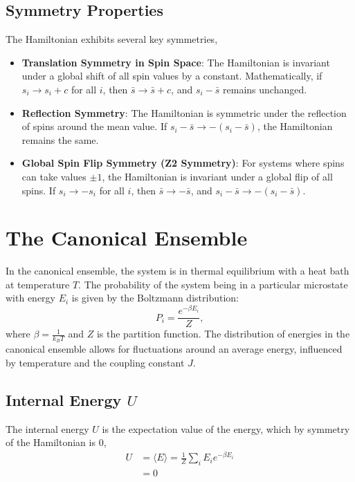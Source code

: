 \documentclass{article}
\begin{document}
\subsection{Symmetry Properties}
The Hamiltonian exhibits several key symmetries,
\begin{itemize}
    \item \textbf{Translation Symmetry in Spin Space}: The Hamiltonian is invariant under a global shift of all spin values by a constant. Mathematically, if \( s_i \to s_i + c \) for all \( i \), then \( \bar{s} \to \bar{s} + c \), and \( s_i - \bar{s} \) remains unchanged.
    \item \textbf{Reflection Symmetry}: The Hamiltonian is symmetric under the reflection of spins around the mean value. If \( s_i - \bar{s} \to - (s_i - \bar{s}) \), the Hamiltonian remains the same.
    \item \textbf{Global Spin Flip Symmetry (Z2 Symmetry)}: For systems where spins can take values \(\pm 1\), the Hamiltonian is invariant under a global flip of all spins. If \( s_i \to -s_i \) for all \( i \), then \( \bar{s} \to -\bar{s} \), and \( s_i - \bar{s} \to - (s_i - \bar{s}) \).
\end{itemize}

\section{The Canonical Ensemble}
In the canonical ensemble, the system is in thermal equilibrium with a heat bath at temperature \( T \). The probability of the system being in a particular microstate with energy \( E_i \) is given by the Boltzmann distribution:
\begin{equation}
P_i = \frac{e^{-\beta E_i}}{Z},
\end{equation}
where \( \beta = \frac{1}{k_B T} \) and \( Z \) is the partition function. The distribution of energies in the canonical ensemble allows for fluctuations around an average energy, influenced by temperature and the coupling constant \( J \).

\subsection{Internal Energy \( U \)}

The internal energy \( U \) is the expectation value of the energy, which by symmetry of the Hamiltonian is 0,
\begin{align}
U &= \langle E \rangle = \frac{1}{Z} \sum_i E_i e^{-\beta E_i}\\
&=0
\end{align}
\end{document}
